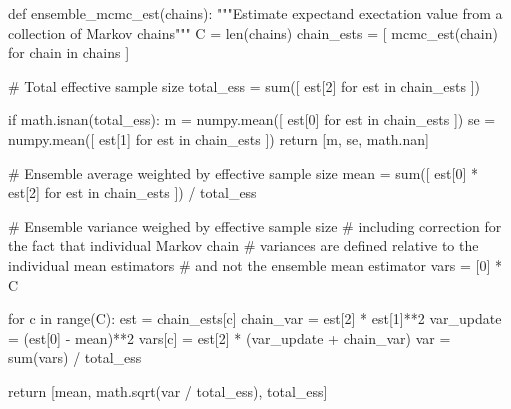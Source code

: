\documentclass[
  letterpaper,
  DIV=11,
  numbers=noendperiod]{scrartcl}
\newenvironment{Shaded}{\begin{snugshade}}{\end{snugshade}}
\newcommand{\BuiltInTok}[1]{\textcolor[rgb]{0.00,0.23,0.31}{#1}}
\newcommand{\CommentTok}[1]{\textcolor[rgb]{0.37,0.37,0.37}{#1}}
\newcommand{\ControlFlowTok}[1]{\textcolor[rgb]{0.00,0.23,0.31}{#1}}
\newcommand{\DecValTok}[1]{\textcolor[rgb]{0.68,0.00,0.00}{#1}}
\newcommand{\KeywordTok}[1]{\textcolor[rgb]{0.00,0.23,0.31}{#1}}
\newcommand{\NormalTok}[1]{\textcolor[rgb]{0.00,0.23,0.31}{#1}}
\newcommand{\OperatorTok}[1]{\textcolor[rgb]{0.37,0.37,0.37}{#1}}
\begin{document}
\begin{Shaded}
\begin{Highlighting}[]
\KeywordTok{def}\NormalTok{ ensemble\_mcmc\_est(chains):}
  \CommentTok{"""Estimate expectand exectation value from a collection of Markov chains"""}
\NormalTok{  C }\OperatorTok{=} \BuiltInTok{len}\NormalTok{(chains)}
\NormalTok{  chain\_ests }\OperatorTok{=}\NormalTok{ [ mcmc\_est(chain) }\ControlFlowTok{for}\NormalTok{ chain }\KeywordTok{in}\NormalTok{ chains ]}
  
  \CommentTok{\# Total effective sample size}
\NormalTok{  total\_ess }\OperatorTok{=} \BuiltInTok{sum}\NormalTok{([ est[}\DecValTok{2}\NormalTok{] }\ControlFlowTok{for}\NormalTok{ est }\KeywordTok{in}\NormalTok{ chain\_ests ])}
  
  \ControlFlowTok{if}\NormalTok{ math.isnan(total\_ess):}
\NormalTok{    m  }\OperatorTok{=}\NormalTok{ numpy.mean([ est[}\DecValTok{0}\NormalTok{] }\ControlFlowTok{for}\NormalTok{ est }\KeywordTok{in}\NormalTok{ chain\_ests ])}
\NormalTok{    se }\OperatorTok{=}\NormalTok{ numpy.mean([ est[}\DecValTok{1}\NormalTok{] }\ControlFlowTok{for}\NormalTok{ est }\KeywordTok{in}\NormalTok{ chain\_ests ])}
    \ControlFlowTok{return}\NormalTok{ [m, se, math.nan]}
  
  \CommentTok{\# Ensemble average weighted by effective sample size}
\NormalTok{  mean }\OperatorTok{=} \BuiltInTok{sum}\NormalTok{([ est[}\DecValTok{0}\NormalTok{] }\OperatorTok{*}\NormalTok{ est[}\DecValTok{2}\NormalTok{] }\ControlFlowTok{for}\NormalTok{ est }\KeywordTok{in}\NormalTok{ chain\_ests ]) }\OperatorTok{/}\NormalTok{ total\_ess}

  \CommentTok{\# Ensemble variance weighed by effective sample size}
  \CommentTok{\# including correction for the fact that individual Markov chain}
  \CommentTok{\# variances are defined relative to the individual mean estimators}
  \CommentTok{\# and not the ensemble mean estimator}
  \BuiltInTok{vars} \OperatorTok{=}\NormalTok{ [}\DecValTok{0}\NormalTok{] }\OperatorTok{*}\NormalTok{ C}
  
  \ControlFlowTok{for}\NormalTok{ c }\KeywordTok{in} \BuiltInTok{range}\NormalTok{(C):}
\NormalTok{    est }\OperatorTok{=}\NormalTok{ chain\_ests[c]}
\NormalTok{    chain\_var }\OperatorTok{=}\NormalTok{ est[}\DecValTok{2}\NormalTok{] }\OperatorTok{*}\NormalTok{ est[}\DecValTok{1}\NormalTok{]}\OperatorTok{**}\DecValTok{2}
\NormalTok{    var\_update }\OperatorTok{=}\NormalTok{ (est[}\DecValTok{0}\NormalTok{] }\OperatorTok{{-}}\NormalTok{ mean)}\OperatorTok{**}\DecValTok{2}
    \BuiltInTok{vars}\NormalTok{[c] }\OperatorTok{=}\NormalTok{ est[}\DecValTok{2}\NormalTok{] }\OperatorTok{*}\NormalTok{ (var\_update }\OperatorTok{+}\NormalTok{ chain\_var)}
\NormalTok{  var }\OperatorTok{=} \BuiltInTok{sum}\NormalTok{(}\BuiltInTok{vars}\NormalTok{) }\OperatorTok{/}\NormalTok{ total\_ess}

  \ControlFlowTok{return}\NormalTok{ [mean, math.sqrt(var }\OperatorTok{/}\NormalTok{ total\_ess), total\_ess]}
\end{Highlighting}
\end{Shaded}
\end{document}
